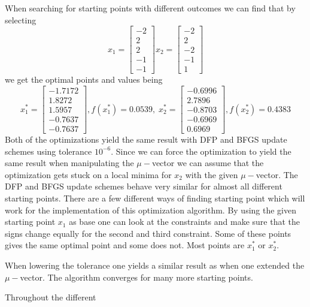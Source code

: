 When searching for starting points with different outcomes we can find that by selecting 
$$x_1=\left[
\begin{array}{c}
-2\\2\\2\\-1\\-1
\end{array}
\right] x_2 =\left[
\begin{array}{c}
-2\\2\\-2\\-1\\1
\end{array}
\right] $$ we get the optimal points and values being $$x_1^*=
\left[
\begin{array}{c}
-1.7172\\1.8272\\1.5957\\-0.7637\\-0.7637
\end{array}
\right], f(x_1^*)=0.0539, \;x_2^* = \left[
\begin{array}{c}
-0.6996\\ 2.7896\\-0.8703\\-0.6969\\0.6969
\end{array}
\right],f(x_2^*)=0.4383$$
Both of the optimizations yield the same result with DFP and BFGS update schemes using tolerance $10^{-6}$. Since we can force the optimization to yield the same result when manipulating the $\mu-$vector we can assume that the optimization gets stuck on a local minima for $x_2$ with the given $\mu-$vector. The DFP and BFGS update schemes behave very similar for almost all different starting points. There are a few different ways of finding starting point which will work for the implementation of this optimization algorithm. By using the given starting point $x_1$ as base one can look at the constraints and make sure that the signs change equally for the second and third constraint. Some of these points gives the same optimal point and some does not. Most points are $x_1^*$ or $x_2^*$. 

When lowering the tolerance one yields a similar result as when one extended the $\mu-$vector. The algorithm converges for many more starting points.

Throughout the different 


